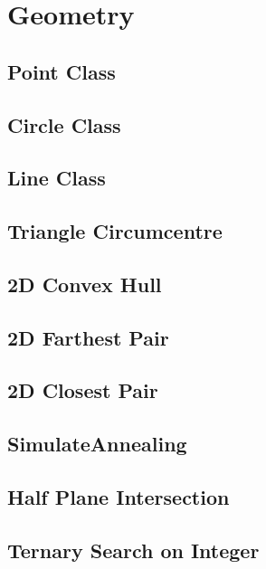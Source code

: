 \documentclass[a4paper,10pt,twocolumn,oneside]{article}
\begin{document}
\section{Geometry}
\subsection{Point Class}

\subsection{Circle Class}

\subsection{Line Class}

\subsection{Triangle Circumcentre}

\subsection{2D Convex Hull}

\subsection{2D Farthest Pair}

\subsection{2D Closest Pair}

\subsection{SimulateAnnealing}

\subsection{Half Plane Intersection}

\subsection{Ternary Search on Integer}

\end{document}
